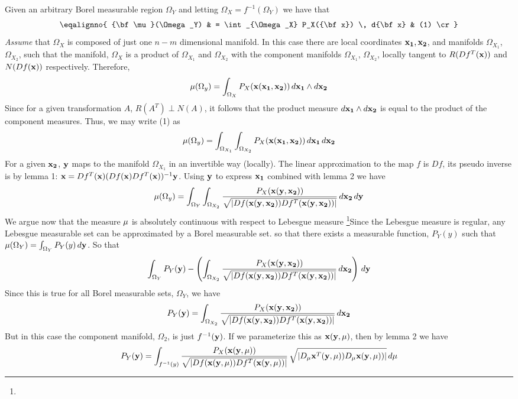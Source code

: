 Given an arbitrary Borel measurable region $\Omega_Y$ and letting
$\Omega_X = f^{-1}(\Omega_Y)$ we have that
$$
\eqalignno{
{\bf \mu}(\Omega_Y) & = 
\int_{\Omega_X} P_X({\bf x}) \, d{\bf x} & (1) \cr
}
$$
{\it Assume\/} that $\Omega_X$ is composed of just one $n-m$ dimensional
manifold. In this case there are local coordinates ${\bf x_1}, {\bf x_2}$, 
and manifolds $\Omega_{X_1}$, $\Omega_{X_2}$, such that the manifold, 
$\Omega_X$ is a product of $\Omega_{X_1}$ and $\Omega_{X_2}$ with
the component manifolds $\Omega_{X_1}$, $\Omega_{X_2}$, 
locally tangent to $R(Df^T({\bf x}))$ and $N(Df({\bf x}))$ respectively.
Therefore,
$$
{\bf \mu}(\Omega_y) = 
\int_{\Omega_X} P_X({\bf x}({\bf x_1}, {\bf x_2})) \, 
d{\bf x_1} \wedge d{\bf x_2}
$$
Since for a given transformation $A$, $R(A^T) \perp N(A)$, it follows
that the product measure $d{\bf x_1} \wedge d{\bf x_2}$ is equal to 
the product of the component measures.
Thus, we may write (1) as 
$$
{\bf \mu}(\Omega_y) = 
\int_{\Omega_{X_1}} \int_{\Omega_{X_2}} 
P_X({\bf x}({\bf x_1}, {\bf x_2})) \, d{\bf x_1} \, d{\bf x_2}
$$
For a given ${\bf x_2}$, ${\bf y}$ maps to the manifold $\Omega_{X_1}$ in an 
invertible way (locally). The linear approximation to the map $f$ is $Df$, its
pseudo inverse is by lemma 1:
${\bf x} = Df^T({\bf x}) (Df({\bf x}) Df^T({\bf x}))^{-1} {\bf y}$.
Using ${\bf y}$ to express ${\bf x_1}$ combined with lemma 2 we have
$$
{\bf \mu}(\Omega_y) = 
\int_{\Omega_Y} \int_{\Omega_{X_2}} 
{P_X({\bf x}({\bf y}, {\bf x_2})) \over 
\sqrt{ |Df({\bf x}({\bf y}, {\bf x_2})) Df^T({\bf x}({\bf y}, {\bf x_2}))| } }
\, d{\bf x_2} \, d{\bf y}
$$
We argue now that the measure ${\bf \mu}$ is absolutely continuous with 
respect to Lebesgue measure%
\footnote{\ddag}{Since the Lebesgue measure is regular, any Lebesgue measurable set can be approximated by a Borel measurable set.} 
so that there exists a measurable function, $P_Y(y)$
such that $\mu(\Omega_Y) = \int_{\Omega_Y} P_Y(y) \, d{\bf y}$.
So that
$$
\int_{\Omega_Y} P_Y({\bf y}) -
\left( \int_{\Omega_{X_2}} 
{P_X({\bf x}({\bf y}, {\bf x_2})) \over 
\sqrt{ |Df({\bf x}({\bf y}, {\bf x_2})) Df^T({\bf x}({\bf y}, {\bf x_2}))| } }
\,  d{\bf x_2} \right) \, d{\bf y}
$$
Since this is true for all Borel measurable sets, $\Omega_Y$, we have
$$
P_Y({\bf y}) =
\int_{\Omega_{X_2}} 
{P_X({\bf x}({\bf y}, {\bf x_2})) \over 
\sqrt{ |Df({\bf x}({\bf y}, {\bf x_2})) Df^T({\bf x}({\bf y}, {\bf x_2}))| } }
\,  d{\bf x_2}
$$
But in this case the component manifold, $\Omega_2$, is just $f^{-1}({\bf y})$.
If we parameterize this as ${\bf x}({\bf y}, {\bf \mu})$, then by lemma 2 we
have
$$
P_Y({\bf y}) =
\int_{f^{-1}(y)}
{P_X({\bf x}({\bf y}, {\bf \mu})) \over 
\sqrt{ |Df({\bf x}({\bf y}, {\bf \mu})) Df^T({\bf x}({\bf y}, {\bf \mu})) | } }
\,  \sqrt{|D_{{\bf \mu}}{\bf x}^T({\bf y}, {\bf \mu})) 
D_{{\bf \mu}}{\bf x}({\bf y}, {\bf \mu})) | } \, d{\bf \mu}
$$

